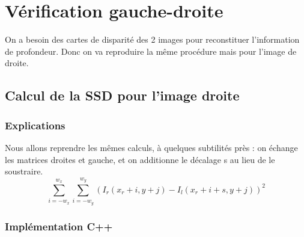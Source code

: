 \documentclass[a4paper]{article}
\begin{document}
\clearpage

\section{Vérification gauche-droite}

On a besoin des cartes de disparité des 2 images pour reconstituer l'information de profondeur. Donc on va reproduire la même procédure mais pour l'image de droite.

\subsection{Calcul de la SSD pour l'image droite}

\subsubsection{Explications}
Nous allons reprendre les mêmes calculs, à quelques subtilités près : on échange les matrices droites et gauche, et on additionne le décalage s au lieu de le soustraire.
\begin{equation}
\sum_{i=-w_x}^{w_x} \sum_{i=-w_y}^{w_y} (I_r(x_r+i,y+j)-I_l(x_r+i+s,y+j))^2
\end{equation}

\subsubsection{Implémentation C++}
\end{document}
